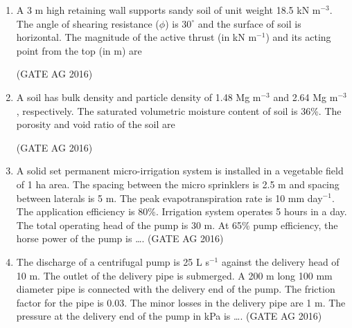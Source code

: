 \documentclass[journal]{IEEEtran}
\begin{document}
\begin{enumerate}
\medskip

\item 
A 3 m high retaining wall supports sandy soil of unit weight 18.5 kN m$^{-3}$. The angle of shearing resistance ($\phi$) is $30^\circ$ and the surface of soil is horizontal. The magnitude of the active thrust (in kN m$^{-1}$) and its acting point from the top (in m) are
\begin{enumerate}
\end{enumerate}
\hfill(GATE AG 2016)\\

\medskip

\item 
A soil has bulk density and particle density of 1.48 Mg m$^{-3}$ and 2.64 Mg m$^{-3}$, respectively. The saturated volumetric moisture content of soil is 36\%. The porosity and void ratio of the soil are
\begin{enumerate}
\end{enumerate}
\hfill(GATE AG 2016)\\

\medskip

\item 
A solid set permanent micro-irrigation system is installed in a vegetable field of 1 ha area. The spacing between the micro sprinklers is 2.5 m and spacing between laterals is 5 m. The peak evapotranspiration rate is 10 mm day$^{-1}$. The application efficiency is 80\%. Irrigation system operates 5 hours in a day. The total operating head of the pump is 30 m. At 65\% pump efficiency, the horse power of the pump is \dots.
\hfill(GATE AG 2016)\\

\medskip

\item 
The discharge of a centrifugal pump is 25 L s$^{-1}$ against the delivery head of 10 m. The outlet of the delivery pipe is submerged. A 200 m long 100 mm diameter pipe is connected with the delivery end of the pump. The friction factor for the pipe is 0.03. The minor losses in the delivery pipe are 1 m. The pressure at the delivery end of the pump in kPa is \dots.
\hfill(GATE AG 2016)\\


\end{enumerate}
\end{document}
